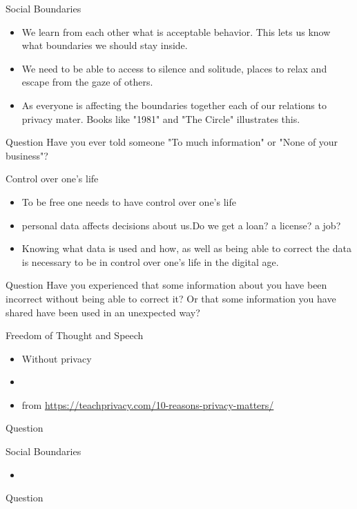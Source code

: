 \documentclass{beamer}
\begin{document}
\begin{frame}{Social Boundaries}
\begin{itemize}
  \item We learn from each other what is acceptable behavior. This lets us know what boundaries we should stay inside.
  \item We need to be able to access to silence and solitude, places to relax and escape from the gaze of others.
  \item As everyone is affecting the boundaries together each of our relations to privacy mater. Books like "1981" and "The Circle" illustrates this.
\end{itemize}
\begin{block}{Question}
Have you ever told someone "To much information" or "None of your business"?
\end{block}
\end{frame}





\begin{frame}{Control over one's life}
\begin{itemize}
  \item To be free one needs to have control over one's life
  \item personal data affects decisions about us.Do we get a loan? a license? a job?
  \item Knowing what data is used and how, as well as being able to correct the data is necessary to be in control over one's life in the digital age.
\end{itemize}
\begin{block}{Question}
Have you experienced that some information about you have been incorrect without being able to correct it? Or that some information you have shared have been used in an unexpected way?
\end{block}
\end{frame}


\begin{frame}{Freedom of Thought and Speech}
\begin{itemize}
  \item Without privacy
  \item
  \item from \url{https://teachprivacy.com/10-reasons-privacy-matters/}
\end{itemize}
\begin{block}{Question}

\end{block}
\end{frame}


\begin{frame}{Social Boundaries}
\begin{itemize}
  \item
\end{itemize}
\begin{block}{Question}

\end{block}
\end{frame}
\end{document}
